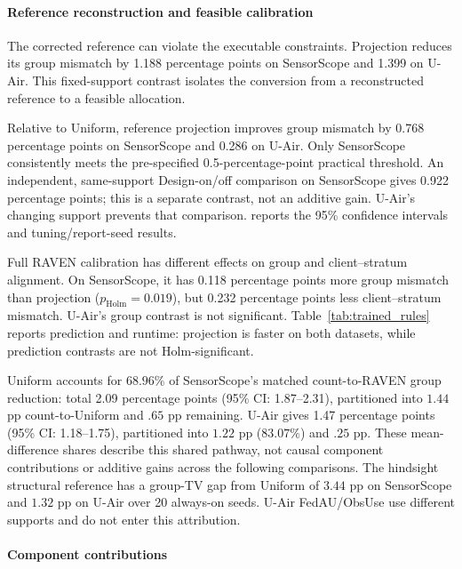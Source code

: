 \documentclass[letterpaper,journal]{IEEEtran}
\begin{document}
\paragraph{Reference reconstruction and feasible calibration}
The corrected reference can violate the executable constraints.
Projection reduces its group mismatch by 1.188 percentage points on
SensorScope and 1.399 on U-Air. This fixed-support contrast isolates the
conversion from a reconstructed reference to a feasible allocation.

Relative to Uniform, reference projection improves group mismatch by
0.768 percentage points on SensorScope and 0.286 on U-Air. Only SensorScope
consistently meets the pre-specified 0.5-percentage-point practical threshold.
An independent, same-support Design-on/off comparison on SensorScope gives
0.922 percentage points; this is a separate contrast, not an additive gain.
U-Air's changing support prevents that comparison.
 reports the 95\% confidence intervals
and tuning/report-seed results.

Full RAVEN calibration has different effects on group and client--stratum
alignment. On SensorScope, it has 0.118 percentage points more group mismatch
than projection ($p_{\mathrm{Holm}}=0.019$), but 0.232 percentage points less
client--stratum mismatch. U-Air's group contrast is not significant.
Table~\ref{tab:trained_rules} reports prediction and runtime: projection is
faster on both datasets, while prediction contrasts are not Holm-significant.

Uniform accounts for $68.96\%$ of SensorScope's matched count-to-RAVEN group
reduction: total 2.09 percentage points (95\% CI: 1.87--2.31), partitioned into $1.44$ pp
count-to-Uniform and $.65$ pp remaining. U-Air gives 1.47 percentage points
(95\% CI: 1.18--1.75), partitioned into $1.22$ pp ($83.07\%$) and $.25$ pp.
These mean-difference shares describe this shared pathway, not causal
component contributions or additive gains across the following comparisons.
The hindsight structural reference has a group-TV gap from Uniform of
$3.44$ pp on SensorScope and $1.32$ pp on U-Air over 20 always-on seeds. U-Air FedAU/ObsUse use
different supports and do not enter this attribution.

\paragraph{Component contributions}
\end{document}
